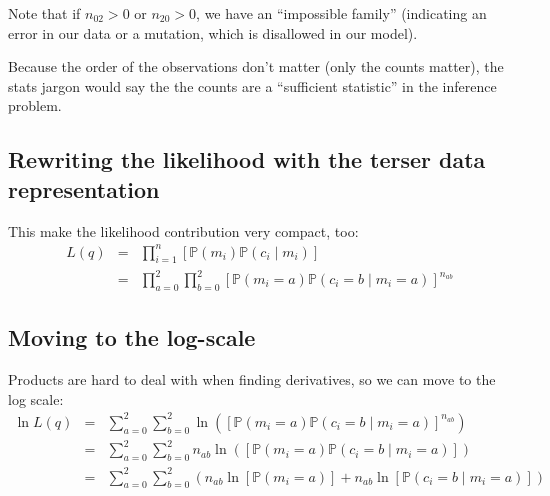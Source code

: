 \documentclass[11pt]{article}
\renewcommand{\Pr}{\mathbb{P}}
\begin{document}
Note that if $n_{02} > 0$ or $n_{20} > 0$, we have an ``impossible family'' (indicating an error in our data or a mutation, which is
disallowed in our model).

Because the order of the observations don't matter (only the counts matter), the stats jargon would
say the the counts are a ``sufficient statistic'' in the inference problem.


\subsection{Rewriting the likelihood with the terser data representation}
This make the likelihood contribution very compact, too:
\begin{eqnarray}\nonumber
  L(q) & = & \prod_{i=1}^{n}\left[\Pr\left(m_i\right)\Pr\left(c_i\mid m_i\right)\right] \\
   & = & \prod_{a=0}^{2}\prod_{b=0}^{2}\left[\Pr\left(m_i=a\right)\Pr\left(c_i=b\mid m_i=a\right)\right]^{n_{ab}}
\end{eqnarray}

\subsection{Moving to the log-scale}

Products are hard to deal with when finding derivatives, so we can move to the log scale:
\begin{eqnarray}\nonumber
 \ln L(q) & = &  \sum_{a=0}^{2}\sum_{b=0}^{2}\ln\left(\left[\Pr\left(m_i=a\right)\Pr\left(c_i=b\mid m_i=a\right)\right]^{n_{ab}}\right)\\
 & = & \sum_{a=0}^{2}\sum_{b=0}^{2}
 n_{ab}\ln\left(\left[\Pr\left(m_i=a\right)\Pr\left(c_i=b\mid m_i=a\right)\right]\right) \\
 & = & \sum_{a=0}^{2}\sum_{b=0}^{2}\left(
 n_{ab}\ln\left[\Pr\left(m_i=a\right)\right] + n_{ab}\ln\left[\Pr\left(c_i=b\mid m_i=a\right)\right] \right) \\
\end{eqnarray}
\end{document}
